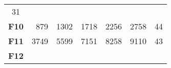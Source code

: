 \documentclass[12pt,a4paper]{article}
\begin{document}
\begin{longtable}[c]{@{}crrrrrr@{}}
\begin{minipage}[t]{0.07\columnwidth}
31
\strut\end{minipage}\tabularnewline
\begin{minipage}[t]{0.11\columnwidth}\centering\strut
\textbf{F10}
\strut\end{minipage} &
\begin{minipage}[t]{0.08\columnwidth}\raggedleft\strut
879
\strut\end{minipage} &
\begin{minipage}[t]{0.08\columnwidth}\raggedleft\strut
1302
\strut\end{minipage} &
\begin{minipage}[t]{0.09\columnwidth}\raggedleft\strut
1718
\strut\end{minipage} &
\begin{minipage}[t]{0.10\columnwidth}\raggedleft\strut
2256
\strut\end{minipage} &
\begin{minipage}[t]{0.11\columnwidth}\raggedleft\strut
2758
\strut\end{minipage} &
\begin{minipage}[t]{0.07\columnwidth}\raggedleft\strut
44
\strut\end{minipage}\tabularnewline
\begin{minipage}[t]{0.11\columnwidth}\centering\strut
\textbf{F11}
\strut\end{minipage} &
\begin{minipage}[t]{0.08\columnwidth}\raggedleft\strut
3749
\strut\end{minipage} &
\begin{minipage}[t]{0.08\columnwidth}\raggedleft\strut
5599
\strut\end{minipage} &
\begin{minipage}[t]{0.09\columnwidth}\raggedleft\strut
7151
\strut\end{minipage} &
\begin{minipage}[t]{0.10\columnwidth}\raggedleft\strut
8258
\strut\end{minipage} &
\begin{minipage}[t]{0.11\columnwidth}\raggedleft\strut
9110
\strut\end{minipage} &
\begin{minipage}[t]{0.07\columnwidth}\raggedleft\strut
43
\strut\end{minipage}\tabularnewline
\begin{minipage}[t]{0.11\columnwidth}\centering\strut
\textbf{F12}
\strut\end{minipage} &
\begin{minipage}[t]{0.08\columnwidth}\raggedleft\strut

\end{minipage}
\end{longtable}
\end{document}
